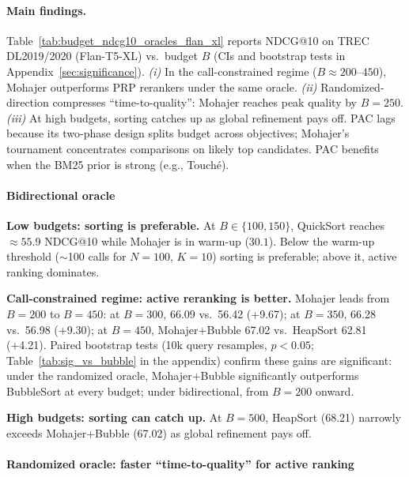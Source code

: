 \documentclass[11pt]{article}
\begin{document}
\vspace{-0.2cm}
\paragraph{Main findings.}
Table~\ref{tab:budget_ndcg10_oracles_flan_xl} reports NDCG@10 on TREC DL2019/2020 (Flan-T5-XL) vs.\ budget $B$ (CIs and bootstrap tests in Appendix~\ref{sec:significance}).
\emph{(i)} In the call-constrained regime ($B \approx 200$--$450$), Mohajer outperforms PRP rerankers under the same oracle.
\emph{(ii)} Randomized-direction compresses ``time-to-quality'': Mohajer reaches peak quality by $B{=}250$.
\emph{(iii)} At high budgets, sorting catches up as global refinement pays off.
PAC lags because its two-phase design splits budget across objectives; Mohajer's tournament concentrates comparisons on likely top candidates. PAC benefits when the BM25 prior is strong (e.g., Touché).




\vspace{-0.2cm}
\paragraph{Bidirectional oracle}
\label{sec:ar-vs-sorting}

\noindent\textbf{Low budgets: sorting is preferable.}
At $B \in \{100,150\}$, QuickSort reaches $\approx 55.9$ NDCG@10 while Mohajer is in warm-up ($30.1$). Below the warm-up threshold ($\sim$100 calls for $N{=}100$, $K{=}10$) sorting is preferable; above it, active ranking dominates.

\noindent\textbf{Call-constrained regime: active reranking is better.}
Mohajer leads from $B{=}200$ to $B{=}450$: at $B{=}300$, 66.09 vs.\ 56.42 (+9.67); at $B{=}350$, 66.28 vs.\ 56.98 (+9.30); at $B{=}450$, Mohajer+Bubble 67.02 vs.\ HeapSort 62.81 (+4.21).
Paired bootstrap tests (10k query resamples, $p{<}0.05$; Table~\ref{tab:sig_vs_bubble} in the appendix) confirm these gains are significant: under the randomized oracle, Mohajer+Bubble significantly outperforms BubbleSort at every budget; under bidirectional, from $B{=}200$ onward.

\noindent\textbf{High budgets: sorting can catch up.} At $B{=}500$, HeapSort (68.21) narrowly exceeds Mohajer+Bubble (67.02) as global refinement pays off.

\vspace{-0.2cm}
\paragraph{Randomized oracle: faster ``time-to-quality'' for active ranking}
\label{sec:stochastic-oracle-vs-sorting}
\end{document}
